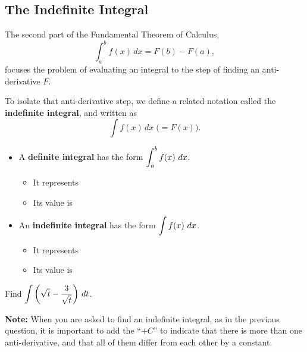 \newpage

\subsection*{The Indefinite Integral}
The second part of the Fundamental Theorem of Calculus,
$$\int_a^b f(x)\,dx = F(b)-F(a),$$ focuses the problem of evaluating
an integral to the step of finding an anti-derivative $F$.  

To isolate that anti-derivative step, we define a related notation
called the {\bf indefinite integral}, and written as
$$\int f(x)\,dx\;\biggl(=F(x)\biggr).$$

\newpage
\begin{itemize}
\item A {\bf definite integral} has the form $\displaystyle \int_a^b f(x) ~dx$.
  \begin{itemize}
  \item It represents 
\vfill
  \item Its value is  
\vfill
  \end{itemize}
\vfill
\item An {\bf indefinite integral} has the form $\displaystyle \int f(x) ~dx$.
  \begin{itemize}
  \item It represents 
\vfill
  \item Its value is 
\vfill 
  \end{itemize}
\end{itemize}

\newpage
\begin{problem}
	Find $\displaystyle \int\left(\sqrt{t}-\frac{3}{\sqrt{t}}\right)\,dt$.
	
\end{problem}

\vfill
{\bf Note:}  When you are asked to find an indefinite integral, as
in the previous question, it is important to add the ``$+ C$'' to
indicate that there is more than one anti-derivative, and that all
of them differ from each other by a constant.\medskip

